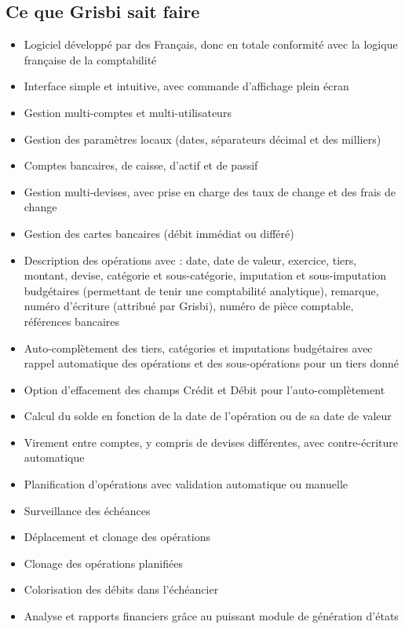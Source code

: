 \subsection{Ce que Grisbi sait faire}

\begin{itemize}
	\item Logiciel développé par des Français, donc en totale conformité avec la logique française de la comptabilité
	\item Interface simple et intuitive, avec commande d'affichage plein écran
	\item Gestion multi-comptes et multi-utilisateurs
	\item Gestion des paramètres locaux (dates, séparateurs décimal et des milliers)	
	\item Comptes bancaires, de caisse, d'actif et de passif
	\item Gestion multi-devises, avec prise en charge des taux de change et des frais de change
	\item Gestion des cartes bancaires (débit immédiat ou différé)	
	\item Description des opérations avec : date, date de valeur, exercice, tiers, montant, devise, catégorie et sous-catégorie, imputation et sous-imputation budgétaires (permettant de tenir une comptabilité analytique), remarque, numéro d'écriture (attribué par Grisbi), numéro de pièce comptable, références bancaires
	\item Auto-complètement des tiers, catégories et imputations budgétaires avec rappel automatique des opérations et des sous-opérations pour un tiers donné
	\item Option d'effacement des champs Crédit et Débit pour l'auto-complètement
	\item Calcul du solde en fonction de la date de l'opération ou de sa date de valeur
	\item Virement entre comptes, y compris de devises différentes, avec contre-écriture automatique
	\item Planification d'opérations avec validation automatique ou manuelle
	\item Surveillance des échéances
	\item Déplacement et clonage des opérations
	\item Clonage des opérations planifiées
	\item Colorisation des débits dans l'échéancier
	\item Analyse et rapports financiers grâce au puissant module de génération d'états

\end{itemize}
